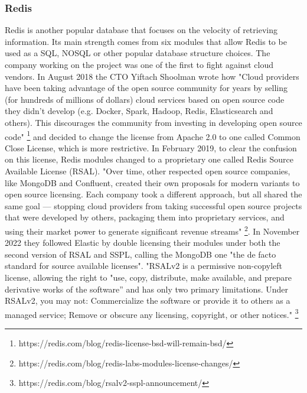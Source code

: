 \documentclass[12pt, a4paper]{article}
\begin{document}
  \subsubsection{Redis}
  Redis is another popular database that focuses on the velocity of retrieving information. Its main strength comes from six modules that allow Redis to be used as a SQL, NOSQL or other popular database structure choices. The company working on the project was one of the first to fight against cloud vendors. In August 2018 the CTO Yiftach Shoolman wrote how "Cloud providers have been taking advantage of the open source community for years by selling (for hundreds of millions of dollars) cloud services based on open source code they didn't develop (e.g. Docker, Spark, Hadoop, Redis, Elasticsearch and others). This discourages the community from investing in developing open source code" \footnote{https://redis.com/blog/redis-license-bsd-will-remain-bsd/} and decided to change the license from Apache 2.0 to one called Common Close License, which is more restrictive. In February 2019, to clear the confusion on this license, Redis modules changed to a proprietary one called Redis Source Available License (RSAL). "Over time, other respected open source companies, like MongoDB and Confluent, created their own proposals for modern variants to open source licensing. Each company took a different approach, but all shared the same goal — stopping cloud providers from taking successful open source projects that were developed by others, packaging them into proprietary services, and using their market power to generate significant revenue streams" \footnote{https://redis.com/blog/redis-labs-modules-license-changes/}. In November 2022 they followed Elastic by double licensing their modules under both the second version of RSAL and SSPL, calling the MongoDB one "the de facto standard for source available licenses". "RSALv2 is a permissive non-copyleft license, allowing the right to "use, copy, distribute, make available, and prepare derivative works of the software” and has only two primary limitations. Under RSALv2, you may not: Commercialize the software or provide it to others as a managed service;  Remove or obscure any licensing, copyright, or other notices." \footnote{https://redis.com/blog/rsalv2-sspl-announcement/}

\end{document}
